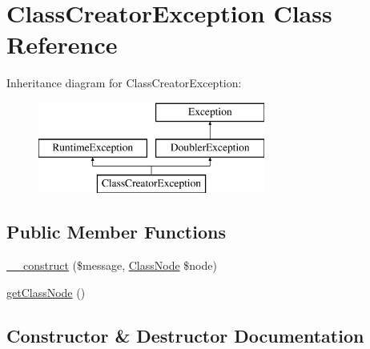 \hypertarget{class_prophecy_1_1_exception_1_1_doubler_1_1_class_creator_exception}{}\section{Class\+Creator\+Exception Class Reference}
\label{class_prophecy_1_1_exception_1_1_doubler_1_1_class_creator_exception}
Inheritance diagram for Class\+Creator\+Exception\+:\begin{figure}[H]
\begin{center}
\leavevmode
\includegraphics[height=3.000000cm]{class_prophecy_1_1_exception_1_1_doubler_1_1_class_creator_exception}
\end{center}
\end{figure}
\subsection*{Public Member Functions}
\begin{DoxyCompactItemize}
\item 
\mbox{\hyperlink{class_prophecy_1_1_exception_1_1_doubler_1_1_class_creator_exception_ab0ac008d1ec62f2f2f7a5dcb8f04fef6}{\+\_\+\+\_\+construct}} (\$message, \mbox{\hyperlink{class_prophecy_1_1_doubler_1_1_generator_1_1_node_1_1_class_node}{Class\+Node}} \$node)
\item 
\mbox{\hyperlink{class_prophecy_1_1_exception_1_1_doubler_1_1_class_creator_exception_ae536f49063b0573c82912fc61dff7c5a}{get\+Class\+Node}} ()
\end{DoxyCompactItemize}


\subsection{Constructor \& Destructor Documentation}
\mbox{\label{class_prophecy_1_1_exception_1_1_doubler_1_1_class_creator_exception_ab0ac008d1ec62f2f2f7a5dcb8f04fef6}} 
